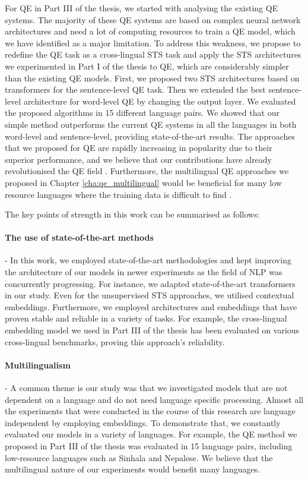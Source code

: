 For QE in Part III of the thesis, we started with analysing the existing QE systems. The majority of these QE systems are based on complex neural network architectures and need a lot of computing resources to train a QE model, which we have identified as a major limitation. To address this weakness, we propose to redefine the QE task as a cross-lingual STS task and apply the STS architectures we experimented in Part I of the thesis to QE, which are considerably simpler than the existing QE models. First, we proposed two STS architectures based on transformers for the sentence-level QE task. Then we extended the best sentence-level architecture for word-level QE by changing the output layer. We evaluated the proposed algorithms in 15 different language pairs. We showed that our simple method outperforms the current QE systems in all the languages in both word-level and sentence-level, providing state-of-the-art results.  The approaches that we proposed for QE are rapidly increasing in popularity due to their superior performance, and we believe that our contributions have already revolutionised the QE field \autocite{ranasinghe-etal-2020-transquest, ranasinghe-etal-2020-transquest-wmt2020}.  Furthermore, the multilingual QE approaches we proposed in Chapter \ref{cha:qe_multilingual} would be beneficial for many low resource languages where the training data is difficult to find \autocite{ranasinghe-etal-2021-exploratory}.

The key points of strength in this work can be summarised as follows:


\paragraph{The use of state-of-the-art methods} - In this work, we employed state-of-the-art methodologies and kept improving the architecture of our models in newer experiments as the field of NLP was concurrently progressing. For instance, we adapted state-of-the-art transformers in our study. Even for the unsupervised STS approaches, we utilised contextual embeddings. Furthermore, we employed architectures and embeddings that have proven stable and reliable in a variety of tasks. For example, the cross-lingual embedding model we used in Part III of the thesis has been evaluated on various cross-lingual benchmarks, proving this approach's reliability.

\paragraph{Multilingualism} - A common theme is our study was that we investigated models that are not dependent on a language and do not need language specific processing. Almost all the experiments that were conducted in the course of this research are language independent by employing embeddings. To demonstrate that, we constantly evaluated our models in a variety of languages. For example, the QE method we proposed in Part III of the thesis was evaluated in 15 language pairs, including low-resource languages such as Sinhala and Nepalese. We believe that the multilingual nature of our experiments would benefit many languages. 

